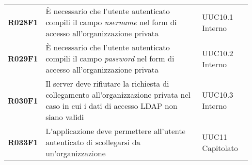 \documentclass[../analisi-dei-requisiti.tex]{subfiles}
\begin{document}
\begin{longtable}[H]{>{\centering\bfseries}m{3cm} >{\centering}m{10cm} >{\centering\arraybackslash}m{3cm}}
  R028F1                               & È necessario che l'utente autenticato compili il campo \textit{username} nel form di accesso all'organizzazione privata                                                                                 & UUC10.1 Interno               \\
  R029F1                               & È necessario che l'utente autenticato compili il campo \textit{password} nel form di accesso all'organizzazione privata                                                                                 & UUC10.2 Interno               \\
  R030F1                               & Il server deve rifiutare la richiesta di collegamento all'organizzazione privata nel caso in cui i dati di accesso LDAP non siano validi                                                                & UUC10.3 Interno               \\
  R033F1                               & L'applicazione deve permettere all'utente autenticato di scollegarsi da un'organizzazione                                                                                                               & UUC11 Capitolato              \\



\end{longtable}
\end{document}
